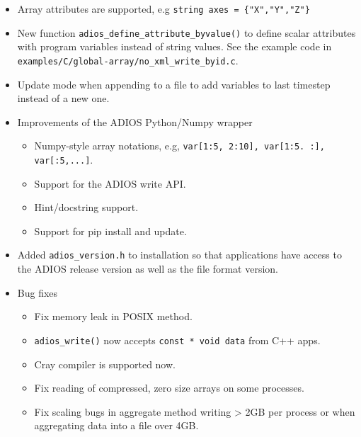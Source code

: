 \begin{itemize}
\item Array attributes are supported, e.g \verb+string axes = {"X","Y","Z"}+
\item New function \verb+adios_define_attribute_byvalue()+ 
         to define scalar attributes with program variables instead of string values. See the example code in
         \verb+examples/C/global-array/no_xml_write_byid.c+.
\item Update mode when appending to a file to add variables to last timestep instead of a new one.

\item Improvements of the ADIOS Python/Numpy wrapper
    \begin{itemize}
    \item Numpy-style array notations, e.g, \verb+var[1:5, 2:10], var[1:5. :], var[:5,...]+.
    \item Support for the ADIOS write API.
    \item Hint/docstring support.
    \item Support for pip install and update.
    \end{itemize}

\item Added \verb+adios_version.h+ to installation so that applications have access to the ADIOS release version as well as the file format version.

\item Bug fixes
    \begin{itemize}
    \item Fix memory leak in POSIX method.
    \item \verb+adios_write()+ now accepts \verb+const * void data+ from C++ apps.
    \item Cray compiler is supported now.
    \item Fix reading of compressed, zero size arrays on some processes.
    \item Fix scaling bugs in aggregate method writing > 2GB per process or when
           aggregating data into a file over 4GB.
    \end{itemize}
\end{itemize}


